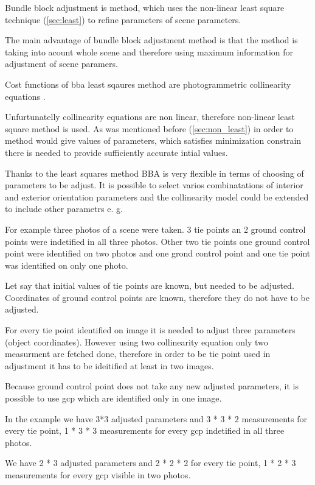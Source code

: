 \documentclass[a4paper,12pt]{report}
\begin{document}
Bundle block adjustment is method, which uses the non-linear least square technique (\ref{sec:least}) to refine parameters 
of scene parameters. 

The main advantage of bundle block adjustment method is that the method is taking into acount whole scene and therefore using 
maximum information for adjustment of scene paramers.

Cost functions of bba least sqaures method are photogrammetric collinearity equations \label{eq:p_abbr}.

Unfurtunatelly collinearity equations are non linear, therefore non-linear least square method is used. 
As was mentioned before  (\ref{sec:non_least}) in order to method would give values of parameters, which 
satisfies minimization constrain there is needed to provide sufficiently accurate intial values.

Thanks to the least squares method BBA is very flexible in terms of choosing of parameters to be adjust. 
It is possible to select varios combinatations of interior and exterior orientation parameters and 
the collinearity model could be extended to include other parametrs e. g.  




For example three photos of a scene were taken. 3 tie points an 2 ground control points were indetified in all three photos.
Other two tie points one ground control point were identified on two photos and one grond control point and one tie point was identified 
on only one photo. 

Let say that initial values of tie points are known, but needed to be adjusted.
Coordinates of ground control points are known, therefore they do not have to be adjusted. 

For every tie point identified on image it is needed to adjust three parameters (object coordinates).
However using two collinearity equation only two measurment are fetched done, 
therefore in order to be tie point used in adjustment it has to be ideitified at least in two images. 

Because ground control point does not take any new adjusted parameters, it is possible to use gcp which are identified only in one image. 

In the example we have 3*3 adjusted parameters and 3 * 3 * 2 measurements for every tie point,  
1 * 3 * 3 measurements for every gcp indetified in all three photos. 

We have 2 * 3 adjusted parameters and 2 * 2 * 2 for every tie point,  
1 * 2 * 3 measurements for every gcp visible in two photos.
\end{document}

